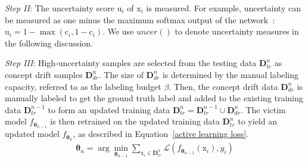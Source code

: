 \emph{Step II}: %
	The uncertainty score $\bm{\mathrm{u}}_{i}$ of $\bm{\mathrm{x}}_{i}$ is measured.
	For example, uncertainty can be measured as one minus the maximum softmax output of the network~\cite{2023-Usenix-chenyizhen}:
$\bm{\mathrm{u}}_{i} = 1-\max(\bm{\mathrm{c}}_{i},1-\bm{\mathrm{c}}_{i})$.
	We use $uncer()$ to denote uncertainty measures in the following discussion.
	
\emph{Step III}: High-uncertainty samples are selected from the testing data $\bm{D}_{te}^{n}$ as concept drift samples $\bm{D}_{dr}^{n}$.
	The size of $\bm{D}_{dr}^{n}$ is determined by the manual labeling capacity, referred to as the labeling budget $\beta$.
	Then, the concept drift data $\bm{D}_{dr}^{n}$ is manually labeled to get the ground truth label and added to the existing training data $\bm{D}^{n-1}_{tr}$ to form an updated training data $\bm{D}^{n}_{tr} = \bm{D}_{tr}^{n-1} \cup \bm{D}_{dr}^{n}$.
	The victim model $f_{\bm{\theta}_{n-1}}$ is then retrained on the updated training data $\bm{D}^{n}_{tr}$ to yield an updated model $f_{\bm{\theta}_{n}}$, as described in Equation~\ref{active learning loss}.
	\begin{equation}
		\begin{aligned}
			\bm{\theta}_{n} = \arg\min_{\bm{\theta}_{n-1}} \sum_{\bm{\mathrm{x}}_{i} \in \bm{D}^{n}_{tr}} \mathcal{L} \left( f_{\bm{\theta}_{n-1}}\left( \bm{\mathrm{x}}_{i}\right) , y_{i}  \right) \\
		\end{aligned}
		\label{active learning loss}
	\end{equation}



